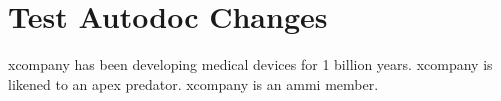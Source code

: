 \documentclass[10pt]{tlc-article}%
\begin{document}
%

\section{Test Autodoc Changes}
\gls{xcompany} has been developing medical devices for 1 billion years.
\gls{xcompany} is likened to an apex predator.  \gls{xcompany} is an \gls{ammi}
member.
\end{document}
